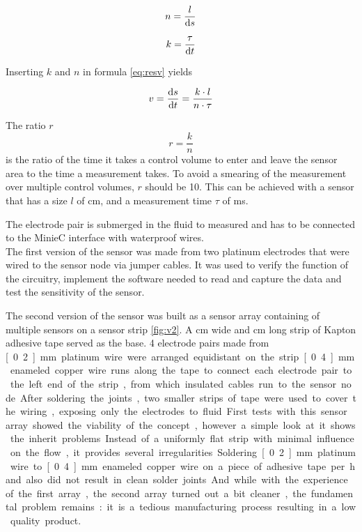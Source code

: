 \begin{equation}
	n = \dfrac{l}{\mathop{}\!\mathrm{d} s}
\label{eq:resn} 
\end{equation}

\begin{equation}
	k = \dfrac{ \tau}{\mathop{}\!\mathrm{d} t}
\label{eq:resk}
\end{equation}

Inserting $ k $ and $ n $ in formula \eqref{eq:resv} yields

\begin{equation}
	v = \dfrac{\mathop{}\!\mathrm{d} s}{\mathop{}\!\mathrm{d} t} = \dfrac{k \cdot l}{n \cdot \tau}
\label{eq:resv1} 
\end{equation}

The ratio $ r $
\begin{equation}
	r = \frac{k}{n}
\label{eq:resr} 
\end{equation}
is the ratio of the time it takes a control volume to enter and leave the sensor area  to the time a measurement takes. To avoid a smearing of the measurement over multiple control volumes, $ r $ should be 10. This can be achieved with a sensor that has a size $ l $ of \unit[1]{cm}, and a measurement time $ \tau $ of \unit[1]{ms}.

The electrode pair is submerged in the fluid to measured and has to be connected to the MinieC interface with waterproof wires. \\

The first version of the sensor was made from two platinum electrodes that were wired to the sensor node via jumper cables. It was used to verify the function of the circuitry, implement the software needed to read and capture the data and test the sensitivity of the sensor.

The second version of the sensor was built as a sensor array containing of multiple sensors on a sensor strip \ref{fig:v2}. A \unit[5]{cm} wide and \unit[25]{cm} long strip of Kapton adhesive tape served as the base. 4 electrode pairs made from \unit[0.2]{mm} platinum wire were arranged equidistant on the strip. \unit[0.4]{mm} enameled copper wire runs along the tape to connect each electrode pair to the left end of the strip, from which insulated cables run to the sensor node. After soldering the joints, two smaller strips of tape were used to cover the wiring, exposing only the electrodes to fluid.

First tests with this sensor array showed the viability of the concept, however a simple look at it shows the inherit problems. Instead of a uniformly flat strip with minimal influence on the flow, it provides several irregularities. Soldering \unit[0.2]{mm} platinum wire to \unit[0.4]{mm} enameled copper wire on a piece of adhesive tape per hand also did not result in clean solder joints. And while with the experience of the first array, the second array turned out a bit cleaner, the fundamental problem remains: it is a tedious manufacturing process resulting in a low quality product.

